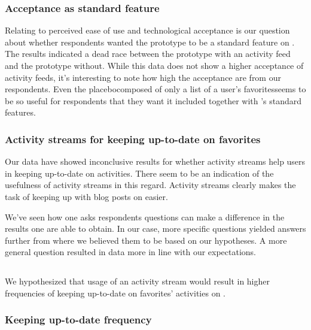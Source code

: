 \subsubsection{Acceptance as standard feature}

Relating to perceived ease of use and technological acceptance is our question
about whether respondents wanted the prototype to be a standard feature
on \urort{}. The results%
indicated a dead race between the prototype with an activity feed and the
prototype without. While this data does not show a higher acceptance of
activity feeds, it's interesting to note how high the acceptance are from
our respondents. Even the placebo\dash{}composed of only a list of
a user's favorites\dash{}seems to be so useful for respondents that they want
it included together with \urort{}'s standard features.

\subsubsection{Activity streams for keeping up-to-date on favorites}

Our data have showed inconclusive results for whether activity
streams help users in keeping up-to-date on activities. There seem to be an
indication of the usefulness of activity streams in this regard.
Activity streams clearly makes the task of keeping up with blog posts on
\urort{} easier.

We've seen how
one asks respondents questions can make a difference in the results one
are able to obtain. In our case, more specific questions yielded answers
further from where we believed them to be based on our hypotheses. A more
general question resulted in data more in line with our expectations.

\subsection{%
}

We hypothesized that usage of an activity stream would result in higher
frequencies of keeping up-to-date on favorites' activities on \urort{}.

\subsubsection{Keeping up-to-date frequency}

